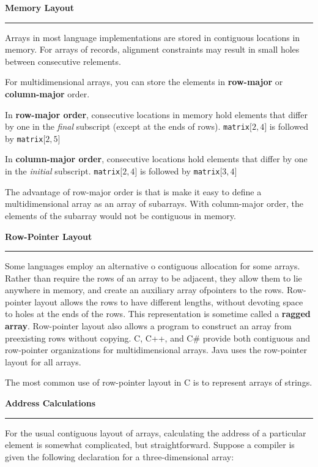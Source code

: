 \nopagenumbers
{\bf Memory Layout}
\vskip 1mm
\hrule

\vskip 6pt
Arrays in most language implementations are stored in contiguous locations in memory. For arrays of records, alignment constraints may result in small holes between consecutive relements.

\vskip 6pt
For multidimensional arrays, you can store the elements in {\bf row-major} or {\bf column-major} order.

\vskip 6pt
In {\bf row-major order}, consecutive locations in memory hold elements that differ by one in the {\it final} subscript (except at the ends of rows). {\tt matrix$\lbrack 2,4\rbrack$} is followed by {\tt matrix$\lbrack 2,5\rbrack$}

\vskip 6pt
In {\bf column-major order}, consecutive locations hold elements that differ by one in the {\it initial} subscript. {\tt matrix$\lbrack 2,4\rbrack$} is followed by {\tt matrix$\lbrack 3,4\rbrack$}

\vskip 6pt
The advantage of row-major order is that is make it easy to define a multidimensional array as an array of subarrays. With column-major order, the elements of the subarray would not be contiguous in memory.

\vskip 12pt

{\bf Row-Pointer Layout}
\vskip 1mm
\hrule

\vskip 6pt
Some languages employ an alternative o contiguous allocation for some arrays. Rather than require the rows of an array to be adjacent, they allow them to lie anywhere in memory, and create an auxiliary array ofpointers to the rows. Row-pointer layout allows the rows to have different lengths, without devoting space to holes at the ends of the rows. This representation is sometime called a {\bf ragged array}. Row-pointer layout also allows a program to construct an array from preexisting rows without copying. C, C++, and C$\#$ provide both contiguous and row-pointer organizations for multidimensional arrays. Java uses the row-pointer layout for all arrays.

\vskip 6pt
The most common use of row-pointer layout in C is to represent arrays of strings.

\vskip 12pt

{\bf Address Calculations}
\vskip 1mm
\hrule

\vskip 6pt
For the usual contiguous layout of arrays, calculating the address of a particular element is somewhat complicated, but straightforward. Suppose a compiler is given the following declaration for a three-dimensional array:

